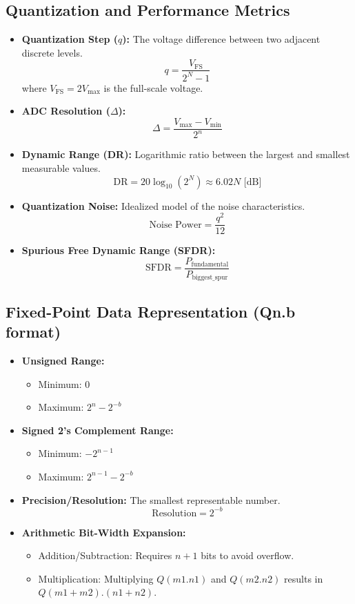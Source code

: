 \documentclass{article}
\begin{document}
\subsection*{Quantization and Performance Metrics}
\begin{itemize}
    \item \textbf{Quantization Step ($q$):} The voltage difference between two adjacent discrete levels.
    \[
    q = \frac{V_{\text{FS}}}{2^N - 1}
    \]
    where $V_{\text{FS}} = 2V_{\max}$ is the full-scale voltage.
    \item \textbf{ADC Resolution ($\Delta$):}
    \[
    \Delta = \frac{V_{\max} - V_{\min}}{2^n}
    \]
    \item \textbf{Dynamic Range (DR):} Logarithmic ratio between the largest and smallest measurable values.
    \[
    \text{DR} = 20 \log_{10}(2^N) \approx 6.02N \text{ [dB]}
    \]
    \item \textbf{Quantization Noise:} Idealized model of the noise characteristics.
    \[
    \text{Noise Power} = \frac{q^2}{12}
    \]
    \item \textbf{Spurious Free Dynamic Range (SFDR):}
    \[
    \text{SFDR} = \frac{P_{\text{fundamental}}}{P_{\text{biggest\_spur}}}
    \]
\end{itemize}

\subsection*{Fixed-Point Data Representation (Qn.b format)}
\begin{itemize}
    \item \textbf{Unsigned Range:}
    \begin{itemize}
        \item Minimum: $0$
        \item Maximum: $2^n - 2^{-b}$
    \end{itemize}
    \item \textbf{Signed 2's Complement Range:}
    \begin{itemize}
        \item Minimum: $-2^{n-1}$
        \item Maximum: $2^{n-1} - 2^{-b}$
    \end{itemize}
    \item \textbf{Precision/Resolution:} The smallest representable number.
    \[
    \text{Resolution} = 2^{-b}
    \]
    \item \textbf{Arithmetic Bit-Width Expansion:}
    \begin{itemize}
        \item Addition/Subtraction: Requires $n+1$ bits to avoid overflow.
        \item Multiplication: Multiplying $Q(m1.n1)$ and $Q(m2.n2)$ results in $Q(m1+m2).(n1+n2)$.
    \end{itemize}
\end{itemize}
\end{document}
